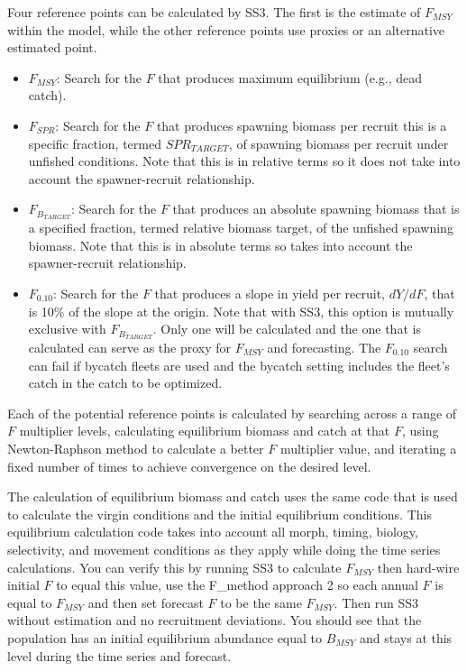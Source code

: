 Four reference points can be calculated by SS3. The first is the estimate of $F_{MSY}$ within the model, while the other reference points use proxies or an alternative estimated point.

\begin{itemize}
	\item $F_{MSY}$: Search for the $F$ that produces maximum equilibrium (e.g., dead catch).
	
	\item $F_{SPR}$: Search for the $F$ that produces spawning biomass per recruit this is a specific fraction, termed $SPR_{TARGET}$, of spawning biomass per recruit under unfished conditions. Note that this is in relative terms so it does not take into account the spawner-recruit relationship.
	
	\item $F_{B_{TARGET}}$: Search for the $F$ that produces an absolute spawning biomass that is a specified fraction, termed relative biomass target, of the unfished spawning biomass. Note that this is in absolute terms so takes into account the spawner-recruit relationship. 
	
	\item $F_{0.10}$: Search for the $F$ that produces a slope in yield per recruit, $dY/dF$, that is 10\% of the slope at the origin. Note that with SS3, this option is mutually exclusive with $F_{B_{TARGET}}$. Only one will be calculated and the one that is calculated can serve as the proxy for $F_{MSY}$ and forecasting. The $F_{0.10}$ search can fail if bycatch fleets are used and the bycatch setting includes the fleet's catch in the catch to be optimized.
\end{itemize}

Each of the potential reference points is calculated by searching across a range of $F$ multiplier levels, calculating equilibrium biomass and catch at that $F$, using Newton-Raphson method to calculate a better $F$ multiplier value, and iterating a fixed number of times to achieve convergence on the desired level.

The calculation of equilibrium biomass and catch uses the same code that is used to calculate the virgin conditions and the initial equilibrium conditions. This equilibrium calculation code takes into account all morph, timing, biology, selectivity, and movement conditions as they apply while doing the time series calculations. You can verify this by running SS3 to calculate $F_{MSY}$ then hard-wire initial $F$ to equal this value, use the F\_method approach 2 so each annual $F$ is equal to $F_{MSY}$ and then set forecast $F$ to be the same $F_{MSY}$. Then run SS3 without estimation and no recruitment deviations. You should see that the population has an initial equilibrium abundance equal to $B_{MSY}$ and stays at this level during the time series and forecast.

